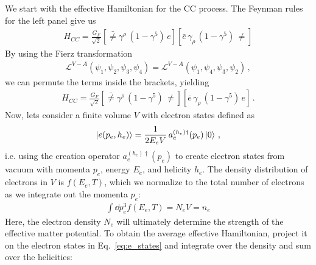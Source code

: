 We start with the effective Hamiltonian for the CC process. The Feynman rules for the left panel give us 
\begin{align}
    H_{CC} = \frac{G_F}{\sqrt{2}}\left[ \bar\ne \gamma^\rho\, (1- \gamma^5)\, e \right] \left[\bar e \,\gamma_\rho\, (1- \gamma^5)\, \ne \right]
\end{align}
By using the Fierz transformation 
\begin{align}
    \mathcal{L}^{V-A}(\psi_1,\psi_2,\psi_3,\psi_4) = \mathcal{L}^{V-A}(\psi_1,\psi_4,\psi_3,\psi_2)\,,
\end{align}
we can permute the terms inside the brackets, yielding
\begin{align}\label{eq:H_fierz}
    H_{CC} = \frac{G_F}{\sqrt{2}}\left[ \bar\ne \gamma^\rho\, (1- \gamma^5)\, \ne \right] \left[\bar e \,\gamma_\rho\, (1- \gamma^5)\, e \right]\,.
\end{align}
Now, lets consider a finite volume $V$ with electron states defined as 
\begin{align}\label{eq:e_states}
    \ket{e(p_e,h_e)} = \frac{1}{2E_eV}\, a_e^{(h_e)\dagger}(p_e)\ket{0}\,,
\end{align}
i.e. using the creation operator $a_e^{(h_e)\dagger}(p_e)$ to create electron states from vacuum with momenta $p_e$, energy $E_e$, and helicity $h_e$.
The density distribution of electrons in $V$ is $f(E_e,T)$, which we normalize to the total number of electrons as we integrate out the momenta $p_e$:
\begin{align}\label{eq:e_density}
    \int \dd p_e^3 f(E_e,T) = N_e V = n_e
\end{align}
Here, the electron density $N_e$ will ultimately determine the strength of the effective matter potential. 
To obtain the average effective Hamiltonian, project it on the electron states in Eq.~\ref{eq:e_states} and integrate over the density and sum over the helicities:

